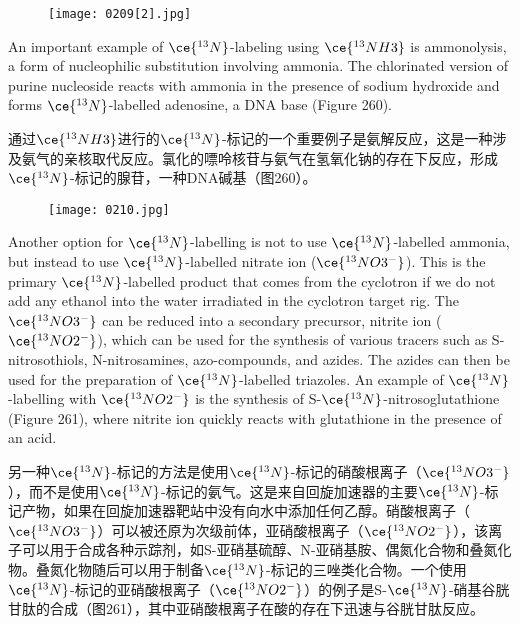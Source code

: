\documentclass[dvipsnames, svgnames,a4paper,11pt]{article}
\begin{document}
\begin{figure}[h]
	\centering
    \texttt{[image: 0209[2].jpg]} 
     \label{fig259}
\end{figure}

An important example of \(\ce{^{13}N}\)-labeling using \(\ce{^{13}NH3}\) is ammonolysis, a form of nucleophilic substitution involving ammonia. The chlorinated version of purine nucleoside reacts with ammonia in the presence of sodium hydroxide and forms \(\ce{^{13}N}\)-labelled adenosine, a DNA base (Figure 260).

通过\(\ce{^{13}NH3}\)进行的\(\ce{^{13}N}\)-标记的一个重要例子是氨解反应，这是一种涉及氨气的亲核取代反应。氯化的嘌呤核苷与氨气在氢氧化钠的存在下反应，形成\(\ce{^{13}N}\)-标记的腺苷，一种DNA碱基（图260）。

\begin{figure}[h]
	\centering
    \texttt{[image: 0210.jpg]} 
     \label{fig260}
\end{figure}

Another option for \(\ce{^{13}N}\)-labelling is not to use \(\ce{^{13}N}\)-labelled ammonia, but instead to use \(\ce{^{13}N}\)-labelled nitrate ion (\(\ce{^{13}NO3^{-}}\)). This is the primary \(\ce{^{13}N}\)-labelled product that comes from the cyclotron if we do not add any ethanol into the water irradiated in the cyclotron target rig. The \(\ce{^{13}NO3^{-}}\) can be reduced into a secondary precursor, nitrite ion (\(\ce{^{13}NO2^{-}}\)), which can be used for the synthesis of various tracers such as S-nitrosothiols, N-nitrosamines, azo-compounds, and azides. The azides can then be used for the preparation of \(\ce{^{13}N}\)-labelled triazoles. An example of \(\ce{^{13}N}\)-labelling with \(\ce{^{13}NO2^{-}}\) is the synthesis of S-\(\ce{^{13}N}\)-nitrosoglutathione (Figure 261), where nitrite ion quickly reacts with glutathione in the presence of an acid.

另一种\(\ce{^{13}N}\)-标记的方法是使用\(\ce{^{13}N}\)-标记的硝酸根离子（\(\ce{^{13}NO3^{-}}\)），而不是使用\(\ce{^{13}N}\)-标记的氨气。这是来自回旋加速器的主要\(\ce{^{13}N}\)-标记产物，如果在回旋加速器靶站中没有向水中添加任何乙醇。硝酸根离子（\(\ce{^{13}NO3^{-}}\)）可以被还原为次级前体，亚硝酸根离子（\(\ce{^{13}NO2^{-}}\)），该离子可以用于合成各种示踪剂，如S-亚硝基硫醇、N-亚硝基胺、偶氮化合物和叠氮化物。叠氮化物随后可以用于制备\(\ce{^{13}N}\)-标记的三唑类化合物。一个使用\(\ce{^{13}N}\)-标记的亚硝酸根离子（\(\ce{^{13}NO2^{-}}\)）的例子是S-\(\ce{^{13}N}\)-硝基谷胱甘肽的合成（图261），其中亚硝酸根离子在酸的存在下迅速与谷胱甘肽反应。
\end{document}
